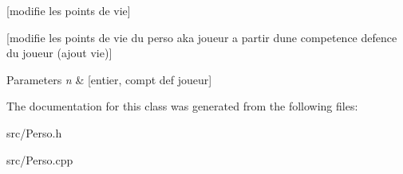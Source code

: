 \mbox{[}modifie les points de vie\mbox{]} 

\mbox{[}modifie les points de vie du perso aka joueur a partir d\textquotesingle{}une competence defence du joueur (ajout vie)\mbox{]}


\begin{DoxyParams}{Parameters}
{\em n} & \mbox{[}entier, compt def joueur\mbox{]} \\
\hline
\end{DoxyParams}


The documentation for this class was generated from the following files\+:\begin{DoxyCompactItemize}
\item 
src/Perso.\+h\item 
src/Perso.\+cpp\end{DoxyCompactItemize}
